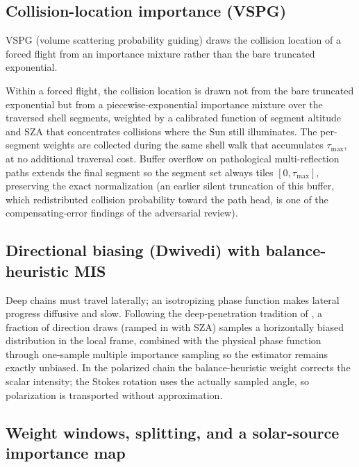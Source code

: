 \documentclass[preprint,12pt]{elsarticle}
\begin{document}
\subsection{Collision-location importance (VSPG)}

VSPG (volume scattering probability guiding) draws the collision
location of a forced flight from an importance mixture rather than
the bare truncated exponential.

Within a forced flight, the collision location is drawn not from the bare
truncated exponential but from a piecewise-exponential importance mixture
over the traversed shell segments, weighted by a calibrated function of
segment altitude and SZA that concentrates collisions where
the Sun still illuminates. The per-segment weights are collected during
the same shell walk that accumulates $\tau_{\max}$, at no additional traversal
cost. Buffer overflow on pathological multi-reflection paths extends the
final segment so the segment set always tiles $[0, \tau_{\max}]$,
preserving the exact normalization (an earlier silent truncation of this
buffer, which redistributed collision probability toward the path head, is
one of the compensating-error findings of the adversarial review).

\subsection{Directional biasing (Dwivedi) with balance-heuristic MIS}

Deep chains must travel laterally; an isotropizing phase function makes
lateral progress diffusive and slow. Following the deep-penetration
tradition of \citet{dwivedi1982}, a fraction of direction draws (ramped in
with SZA) samples a horizontally biased distribution in the local frame,
combined with the physical phase function through one-sample multiple
importance sampling so the estimator remains exactly unbiased. In the
polarized chain the balance-heuristic weight corrects the scalar
intensity; the Stokes rotation uses the actually sampled angle, so
polarization is transported without approximation.

\subsection{Weight windows, splitting, and a solar-source importance map}
\end{document}
